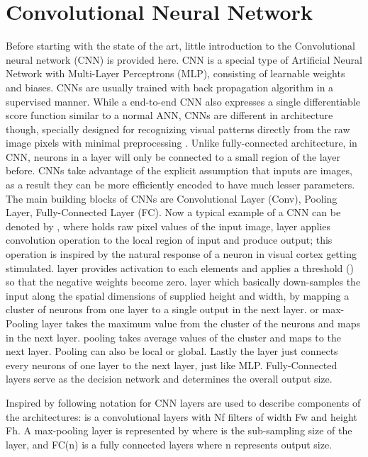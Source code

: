 \section{Convolutional Neural Network}
Before starting with the state of the art, little introduction to the Convolutional neural network (CNN) is provided here. CNN \cite{wikicnn} is a special type of Artificial Neural Network with Multi-Layer Perceptrons (MLP),
consisting of learnable weights and biases. CNNs are usually trained with back propagation algorithm in a 
supervised manner. While a end-to-end CNN also expresses a single differentiable score function similar to a normal ANN, CNNs are different in architecture though, specially designed for recognizing visual patterns directly 
from the raw image pixels with minimal preprocessing \cite{lecun2015lenet}. Unlike fully-connected architecture, in CNN, neurons in a layer will only be connected to a small region of the layer before.
CNNs take advantage of the explicit assumption that inputs are images, as a result they can be more efficiently encoded to have much lesser parameters. The main building blocks of CNNs are Convolutional Layer (Conv), 
Pooling Layer, Fully-Connected Layer (FC). Now a typical example of a CNN can be denoted by , where  holds raw pixel values of the input image,  layer applies 
convolution operation to the local region of input and produce output; this operation is inspired by the natural response of a neuron in visual cortex getting stimulated.  layer provides activation to each elements 
and applies a threshold () so that the negative weights become zero.  layer which basically down-samples the input along the spatial dimensions of supplied height and width, by mapping a cluster of neurons
from one layer to a single output in the next layer.  or max-Pooling layer takes the maximum value from the cluster of the neurons and maps in the next layer.  pooling takes average values of the cluster and maps to the 
next layer. Pooling can also be local or global. Lastly the  layer just connects every neurons of one layer to the next layer, just like MLP. Fully-Connected layers serve as the decision network and determines the overall output size.

Inspired by \cite{stateoftheart} following notation for CNN layers are used to describe components of the architectures:  is a convolutional layers with Nf filters of width Fw and height Fh.
A max-pooling layer is represented by  where  is the sub-sampling size of the layer, and FC(n) is a fully connected layers where n represents output size.\\

